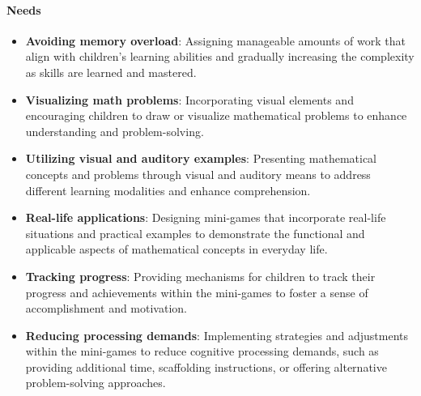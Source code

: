 \paragraph{Needs}
\begin{itemize}
    \item \textbf{Avoiding memory overload}: Assigning manageable amounts of work that align with children's learning abilities and gradually increasing the complexity as skills are learned and mastered.
    \item \textbf{Visualizing math problems}: Incorporating visual elements and encouraging children to draw or visualize mathematical problems to enhance understanding and problem-solving.
    \item \textbf{Utilizing visual and auditory examples}: Presenting mathematical concepts and problems through visual and auditory means to address different learning modalities and enhance comprehension.
    \item \textbf{Real-life applications}: Designing mini-games that incorporate real-life situations and practical examples to demonstrate the functional and applicable aspects of mathematical concepts in everyday life.
    \item \textbf{Tracking progress}: Providing mechanisms for children to track their progress and achievements within the mini-games to foster a sense of accomplishment and motivation.
    \item \textbf{Reducing processing demands}: Implementing strategies and adjustments within the mini-games to reduce cognitive processing demands, such as providing additional time, scaffolding instructions, or offering alternative problem-solving approaches.
\end{itemize}
